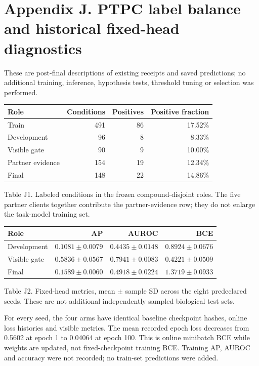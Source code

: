 \section*{Appendix J. PTPC label balance and historical fixed-head diagnostics}
\label{app:ptpc-diagnostics}
These are post-final descriptions of existing receipts and saved predictions; no additional training, inference, hypothesis tests, threshold tuning or selection was performed.
\begin{center}\small\setlength{\tabcolsep}{8pt}
\begin{tabular}{lrrr}\toprule
Role & Conditions & Positives & Positive fraction \\
\midrule
Train & 491 & 86 & 17.52\% \\
Development & 96 & 8 & 8.33\% \\
Visible gate & 90 & 9 & 10.00\% \\
Partner evidence & 154 & 19 & 12.34\% \\
Final & 148 & 22 & 14.86\% \\
\bottomrule\end{tabular}\end{center}
Table J1. Labeled conditions in the frozen compound-disjoint roles. The five partner clients together contribute the partner-evidence row; they do not enlarge the task-model training set.
\begin{center}\small\setlength{\tabcolsep}{6pt}
\begin{tabular}{lrrr}\toprule
Role & AP & AUROC & BCE \\
\midrule
Development & $0.1081 \pm 0.0079$ & $0.4435 \pm 0.0148$ & $0.8924 \pm 0.0676$ \\
Visible gate & $0.5836 \pm 0.0567$ & $0.7941 \pm 0.0083$ & $0.4221 \pm 0.0509$ \\
Final & $0.1589 \pm 0.0060$ & $0.4918 \pm 0.0224$ & $1.3719 \pm 0.0933$ \\
\bottomrule\end{tabular}\end{center}
Table J2. Fixed-head metrics, mean $\pm$ sample SD across the eight predeclared seeds. These are not additional independently sampled biological test sets.

For every seed, the four arms have identical baseline checkpoint hashes, online loss histories and visible metrics. The mean recorded epoch loss decreases from 0.5602 at epoch 1 to 0.04064 at epoch 100. This is online minibatch BCE while weights are updated, not fixed-checkpoint training BCE. Training AP, AUROC and accuracy were not recorded; no train-set predictions were added.

